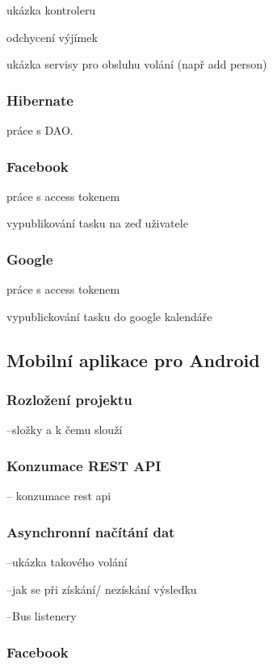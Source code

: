 \documentclass[thesis=B,czech]{FITthesis}[2012/06/26]
\begin{document}
ukázka kontroleru

odchycení výjímek

ukázka servisy pro obsluhu volání (např add person)

\subsubsection{Hibernate}

práce s DAO.

\subsubsection{Facebook}

práce s access tokenem

vypublikování tasku na zeď uživatele

\subsubsection{Google}

práce s access tokenem

vypublickování tasku do google kalendáře


\subsection{Mobilní aplikace pro Android}

\subsubsection{Rozložení projektu}

--složky a k čemu slouží

\subsubsection{Konzumace REST API}

-- konzumace rest api

\subsubsection{Asynchronní načítání dat}

--ukázka takového volání 

--jak se při získání/ nezískání výsledku

--Bus listenery

\subsubsection{Facebook}
\end{document}
